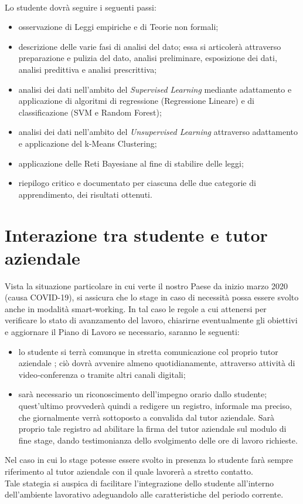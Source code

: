 \\Lo studente dovrà seguire i seguenti passi:
\begin{itemize}
\item osservazione di Leggi empiriche e di Teorie non formali;
\item descrizione delle varie fasi di analisi del dato; essa si articolerà attraverso preparazione e pulizia del dato, analisi preliminare, esposizione dei dati, analisi predittiva e analisi prescrittiva;  
\item analisi dei dati nell'ambito del \textit{Supervised Learning} mediante adattamento e applicazione di algoritmi di regressione (Regressione Lineare) e di classificazione (SVM e Random Forest);
\item analisi dei dati nell'ambito del \textit{Unsupervised Learning} attraverso  adattamento e applicazione del k-Means Clustering;
\item applicazione delle Reti Bayesiane al fine di stabilire delle leggi;
\item riepilogo critico e documentato per ciascuna delle due categorie di apprendimento, dei risultati ottenuti.
\end{itemize}

\section{Interazione tra studente e tutor aziendale}
Vista la situazione particolare in cui verte il nostro Paese da inizio marzo 2020 (causa COVID-19), si assicura che lo stage in caso di necessità possa essere svolto anche in modalità smart-working. In tal caso le regole a cui attenersi per verificare lo stato di avanzamento del lavoro, chiarirne eventualmente gli obiettivi e aggiornare il Piano di Lavoro se necessario, saranno le seguenti:
\begin{itemize}
\item lo studente si terrà comunque in stretta comunicazione col proprio tutor aziendale \Greg; ciò dovrà avvenire almeno quotidianamente, attraverso attività di video‐conferenza o tramite altri canali digitali;
\item sarà necessario un riconoscimento dell'impegno orario dallo studente; quest'ultimo provvederà quindi a redigere un registro, informale ma preciso, che giornalmente verrà sottoposto a convalida dal tutor aziendale. Sarà proprio tale registro ad abilitare la firma del tutor aziendale sul modulo di fine stage, dando testimonianza dello svolgimento delle ore di lavoro richieste.
\end{itemize}  
Nel caso in cui lo stage potesse essere svolto in presenza lo studente farà sempre riferimento al tutor aziendale \Greg{} con il quale lavorerà a stretto contatto. \\Tale stategia si auspica di facilitare l'integrazione dello studente all'interno dell'ambiente lavorativo adeguandolo alle caratteristiche del periodo corrente.


